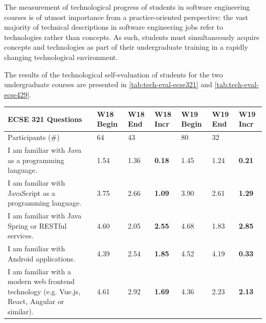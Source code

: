 \documentclass[a4paper,11pt]{report}
\begin{document}
The measurement of technological progress of students in software engineering courses is of utmost importance from a practice-oriented perspective: the vast majority of technical descriptions in software engineering jobs refer to technologies rather than concepts. As such, students must simultaneously acquire concepts and technologies as part of their undergraduate training in a rapidly changing technological environment. 

The results of the technological self-evaluation of students for the two undergraduate courses are presented in \autoref{tab:tech-eval-ecse321} and \autoref{tab:tech-eval-ecse429}.



\begin{table}[htb]
\footnotesize
\begin{tabular}{@{}p{8cm}p{1cm}p{1cm}p{1cm}p{1cm}p{1cm}p{1cm}@{}}
\toprule
\textbf{ECSE 321 Questions} & 
\textbf{W18} \newline \textbf{Begin} & 
\textbf{W18} \newline \textbf{End} & 
\textbf{W18} \newline \textbf{Incr} & 
\textbf{W19} \newline \textbf{Begin} & 
\textbf{W19} \newline \textbf{End} &
\textbf{W19} \newline \textbf{Incr} \\ \toprule
Participants (\#) & 64 & 43 &  & 80 & 32 &  \\ \midrule
I am familiar with Java as a programming language. & 1.54 & 1.36 & \textbf{0.18} & 1.45 & 1.24 & \textbf{0.21} \\ \midrule

I am familiar with JavaScript as a programming language. & 3.75 & 2.66 & \textbf{1.09} & 3.90 & 2.61 & \textbf{1.29} \\ \midrule

I am familiar with Java Spring or RESTful services. & 4.60 & 2.05 & \textbf{2.55} & 4.68 & 1.83 & \textbf{2.85}  \\ \midrule

I am familiar with Android applications. & 4.39 & 2.54 & \textbf{1.85} & 4.52 & 4.19 & \textbf{0.33}   \\ \midrule

I am familiar with a modern web frontend technology (e.g. Vue.js, React, Angular or similar). & 4.61 & 2.92 & \textbf{1.69} & 4.36 & 2.23 & \textbf{2.13}  \\ \midrule


\end{tabular}
\end{table}
\end{document}
